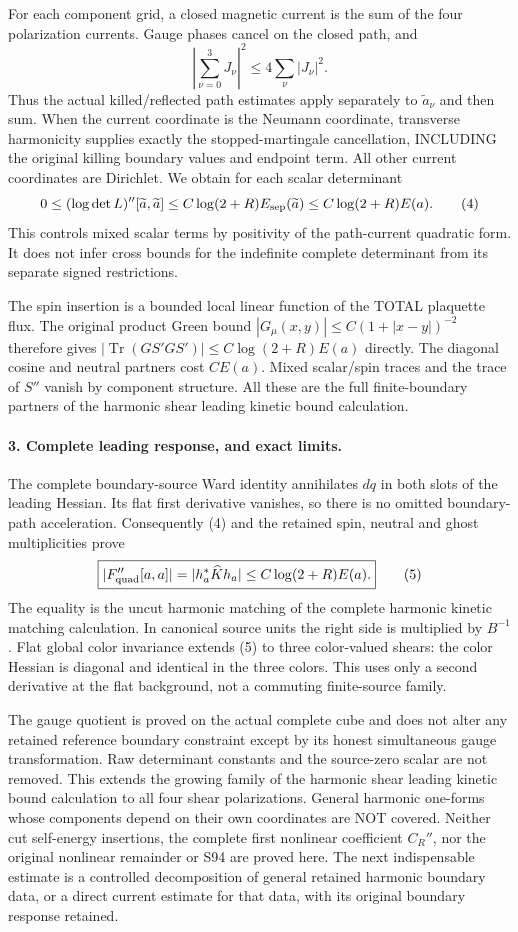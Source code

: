 \documentclass[11pt]{article}
\begin{document}
For each component grid, a closed magnetic current is the sum of the
four polarization currents. Gauge phases cancel on the closed path,
and
\[
 \left|\sum_{\nu=0}^3J_\nu\right|^2\le4\sum_\nu|J_\nu|^2.
\]
Thus the actual killed/reflected path estimates apply separately
to $\widetilde a_\nu$ and then sum. When the current coordinate is the
Neumann coordinate, transverse harmonicity supplies exactly the
stopped-martingale cancellation, INCLUDING the original killing
boundary values and endpoint term. All other current coordinates
are Dirichlet. We obtain for each scalar determinant
\[
 0\le(\log\det L)''[\widetilde a,\widetilde a]
       \le C\log(2+R)E_{\rm sep}(\widetilde a)
       \le C\log(2+R)E(a).                                   \tag{4}
\]
This controls mixed scalar terms by positivity of the path-current
quadratic form. It does not infer cross bounds for the indefinite
complete determinant from its separate signed restrictions.

The spin insertion is a bounded local linear function of the TOTAL
plaquette flux. The original product Green bound
$|G_\mu(x,y)|\le C(1+|x-y|)^{-2}$ therefore gives
$|\operatorname{Tr}(GS'GS')|\le C\log(2+R)E(a)$ directly.
The diagonal cosine and neutral partners cost $CE(a)$.
Mixed scalar/spin traces and the trace of $S''$ vanish by component
structure. All these are the full finite-boundary partners of the harmonic shear leading kinetic bound calculation.

\paragraph{3. Complete leading response, and exact limits.}
The complete boundary-source Ward identity annihilates $dq$ in both
slots of the leading Hessian. Its flat first derivative vanishes, so
there is no omitted boundary-path acceleration. Consequently (4) and
the retained spin, neutral and ghost multiplicities prove
\[
 \boxed{|F_{\rm quad}''[a,a]|
       =|h_a^*\widehat K h_a|
       \le C\log(2+R)E(a).}                                  \tag{5}
\]
The equality is the uncut harmonic matching of the complete harmonic kinetic matching calculation.
In canonical source units the right side is multiplied by $B^{-1}$.
Flat global color invariance extends (5) to three color-valued shears:
the color Hessian is diagonal and identical in the three colors.
This uses only a second derivative at the flat background, not a
commuting finite-source family.

The gauge quotient is proved on the actual complete cube and does
not alter any retained reference boundary constraint except by its
honest simultaneous gauge transformation. Raw determinant constants
and the source-zero scalar are not removed.
This extends the growing family of the harmonic shear leading kinetic bound calculation to all four shear
polarizations. General harmonic one-forms whose components depend
on their own coordinates are NOT covered. Neither cut self-energy
insertions, the complete first nonlinear coefficient $C_R''$, nor the
original nonlinear remainder or S94 are proved here.
The next indispensable estimate is a controlled decomposition of
general retained harmonic boundary data, or a direct current estimate
for that data, with its original boundary response retained.
\end{document}
